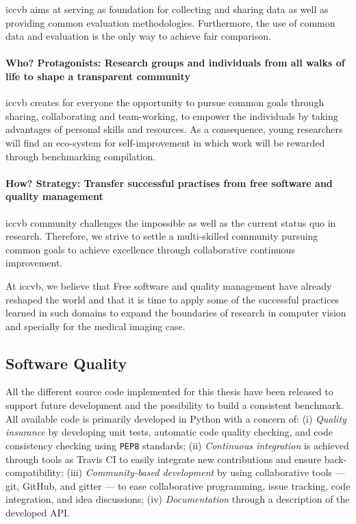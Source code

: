 \Ac{iccvb} aims at serving as foundation for collecting and sharing data as well as providing common evaluation methodologies.
Furthermore, the use of common data and evaluation is the only way to achieve fair comparison.

\paragraph{Who? Protagonists: Research groups and individuals from all walks of life to shape a transparent community}
\Ac{iccvb} creates for everyone the opportunity to pursue common goals through sharing, collaborating and team-working, to empower the individuals by taking advantages of personal skills and resources.
As a consequence, young researchers will find an eco-system for self-improvement in which work will be rewarded through benchmarking compilation.

\paragraph{How? Strategy: Transfer successful practises from free software and quality management}
\Ac{iccvb} community challenges the impossible as well as the current status quo in research.
Therefore, we strive to settle a multi-skilled community pursuing common goals to achieve excellence through collaborative continuous improvement.

At \ac{iccvb}, we believe that Free software and quality management have already reshaped the world and that it is time to apply some of the successful practices learned in such domains to expand the boundaries of research in computer vision and specially for the medical imaging case.

\subsection{Software Quality}

All the different source code implemented for this thesis have been released to support future development and the possibility to build a consistent benchmark.
All available code is primarily developed in Python with a concern of:
(i) \emph{Quality insurance} by developing unit tests, automatic code quality checking, and code consistency checking using \texttt{PEP8} standards;
(ii) \emph{Continuous integration} is achieved through tools as Travis CI to easily integrate new contributions and ensure back-compatibility;
(iii) \emph{Community-based development} by using collaborative tools --- git, GitHub, and gitter --- to ease collaborative programming, issue tracking, code integration, and idea discussions;
(iv) \emph{Documentation} through a description of the developed API.

